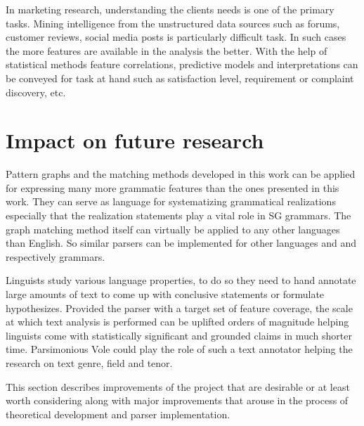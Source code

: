 In marketing research, understanding the clients needs is one of the primary tasks. Mining intelligence from the unstructured data sources such as forums, customer reviews, social media posts is particularly difficult task. In such cases the more features are available in the analysis the better. With the help of  statistical methods feature correlations, predictive models and interpretations can be conveyed for task at hand such as satisfaction level, requirement or complaint discovery, etc.

\section{Impact on future research}
\label{sec:future-work}

Pattern graphs and the matching methods developed in this work can be applied for expressing many more grammatic features than the ones presented in this work. They can serve as language for systematizing grammatical realizations especially that the realization statements play a vital role in SG grammars. The graph matching method itself can virtually be applied to any other languages than English. So similar parsers can be implemented for other languages and and respectively grammars. 

Linguists study various language properties, to do so they need to hand annotate large amounts of text to come up with conclusive statements or formulate hypothesizes. Provided the parser with a target set of feature coverage, the scale at which text analysis is performed can be uplifted orders of magnitude helping linguists come with statistically significant and grounded claims in much shorter time. Parsimonious Vole could play the role of such a text annotator helping the research on text genre, field and tenor.



%
%
%

This section describes improvements of the project that are desirable or at least worth considering along with major improvements that arouse in the process of theoretical development and parser implementation. 

